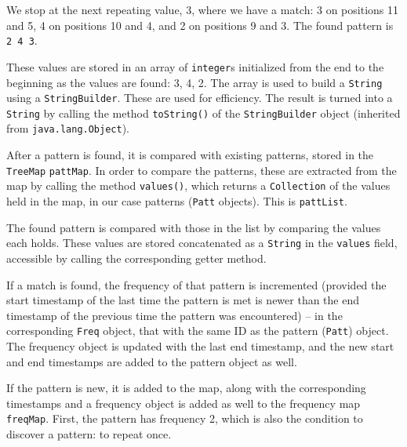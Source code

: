 \documentclass[a4paper,12pt]{article}
\begin{document}
  We stop at the next repeating value, 3, where we have a match: 3 on positions 11 and 5,
  4 on positions 10 and 4, and 2 on positions 9 and 3. The found pattern is \verb/2 4 3/.
  
  These values are stored in an array of \verb/integer/s initialized from the end to the beginning
  as the values are found: 3, 4, 2. The array is used to build a \verb/String/ using a
  \verb/StringBuilder/. These are used for efficiency. The result is turned into a \verb/String/
  by calling the method \verb/toString()/ of the \verb/StringBuilder/ object (inherited from
  \verb/java.lang.Object/).
  
  After a pattern is found, it is compared with existing patterns, stored in the \verb/TreeMap/
  \verb/pattMap/. In order to compare the patterns, these are extracted from the map by calling
  the method \verb/values()/, which returns a \verb/Collection/ of the values held in the map,
  in our case patterns (\verb/Patt/ objects). This is \verb/pattList/.
  
  The found pattern is compared with those in the list by comparing the values each holds.
  These values are stored concatenated as a \verb/String/ in the \verb/values/ field, accessible
  by calling the corresponding getter method.
  
  If a match is found, the frequency of that pattern is incremented (provided the start timestamp
  of the last time the pattern is met is newer than the end timestamp of the previous time the
  pattern was encountered) -- in the corresponding \verb/Freq/ object, that with the same ID as
  the pattern (\verb/Patt/) object. The frequency object is updated with the last end timestamp,
  and the new start and end timestamps are added to the pattern object as well.
  
  If the pattern is new, it is added to the map, along with the corresponding timestamps
  and a frequency object is added as well to the frequency map \verb/freqMap/.
  First, the pattern has frequency 2, which is also the condition to discover a pattern:
  to repeat once.


 


 
\end{document}
